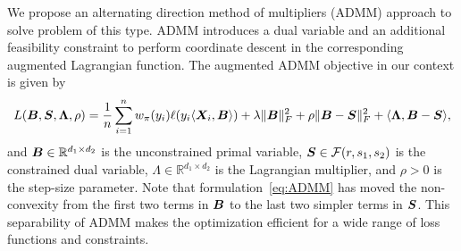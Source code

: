 \documentclass[11pt]{article}
\theoremstyle{definition}
\begin{document}
We propose an alternating direction method of multipliers (ADMM) approach to solve problem of this type. ADMM introduces a dual variable and an additional feasibility constraint to perform coordinate descent in the corresponding augmented Lagrangian function. The augmented ADMM objective in our context is given by
\begin{equation}\label{eq:ADMM}
L(\bm B,\bm S,\bm{\Lambda},\rho)={1\over n}\sum_{i=1}^nw_\pi(y_i)\ell(y_i\langle \bm X_i,\bm B \rangle) + \lambda\lVert\bm B\rVert_F^2+\rho\lVert\bm B-\bm S\rVert_F^2+\langle \bm{\Lambda}, \bm B-\bm S\rangle,
\end{equation}
and $\bm B\in \mathbb{R}^{d_1\times d_2}$ is the unconstrained primal variable, $\bm S\in\mathcal{F}(r,s_1,s_2)$ is the constrained dual variable, $\Lambda\in\mathbb{R}^{d_1\times d_2}$ is the  Lagrangian multiplier, and $\rho>0$ is the step-size parameter. Note that formulation~\eqref{eq:ADMM} has moved the non-convexity from the first two terms in $\bm B$ to the last two simpler terms in $\bm S$. This separability of ADMM makes the optimization efficient for a wide range of loss functions and constraints. 
\end{document}
